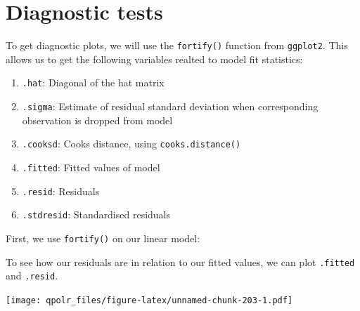\documentclass[12pt,oneside]{reedthesis}
\providecommand{\tightlist}{%
  \setlength{\itemsep}{0pt}\setlength{\parskip}{0pt}}
\theoremstyle{definition}
\theoremstyle{definition}
\theoremstyle{definition}
\theoremstyle{remark}
\begin{document}
  \section{Diagnostic tests}\label{diagnostic-tests}
  
  To get diagnostic plots, we will use the \texttt{fortify()} function
  from \texttt{ggplot2}. This allows us to get the following variables
  realted to model fit statistics:
  \begin{enumerate}
  \def\labelenumi{\arabic{enumi}.}
  \tightlist
  \item
    \texttt{.hat}: Diagonal of the hat matrix
  \item
    \texttt{.sigma}: Estimate of residual standard deviation when
    corresponding observation is dropped from model
  \item
    \texttt{.cooksd}: Cooks distance, using \texttt{cooks.distance()}
  \item
    \texttt{.fitted}: Fitted values of model
  \item
    \texttt{.resid}: Residuals
  \item
    \texttt{.stdresid}: Standardised residuals
  \end{enumerate}
  First, we use \texttt{fortify()} on our linear model:
  \begin{Shaded}
  \begin{Highlighting}[]
  \StringTok{ }
  \end{Highlighting}
  \end{Shaded}
  To see how our residuals are in relation to our fitted values, we can
  plot \texttt{.fitted} and \texttt{.resid}.
  \begin{Shaded}
  \begin{Highlighting}[]
  \NormalTok{(}\OperatorTok{+}
  \StringTok{  }\NormalTok{() }\OperatorTok{+}
  \StringTok{  }\NormalTok{(} \NormalTok{) }\OperatorTok{+}
  \StringTok{  }\NormalTok{(} \NormalTok{) }\OperatorTok{+}
  \StringTok{  }\NormalTok{(} \NormalTok{,}
          \NormalTok{,}
          \NormalTok{)}
  \end{Highlighting}
  \end{Shaded}
  \texttt{[image: qpolr\_files/figure-latex/unnamed-chunk-203-1.pdf]}
  
\end{document}
